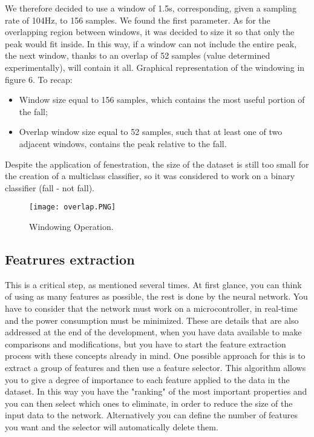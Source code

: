 \documentclass[12pt]{article}
\begin{document}
We therefore decided to use a window of 1.5s, corresponding, given a sampling rate of 104Hz, to 156 samples. We found the first parameter. 
As for the overlapping region between windows, it was decided to size it so that only the peak would fit inside. In this way, if a window can not include the entire peak, the next window, thanks to an overlap of 52 samples (value determined experimentally), will contain it all. Graphical representation of the windowing in figure 6.
To recap:
\begin{itemize}
  \item Window size equal to 156 samples, which contains the most useful portion of the fall;
  \item Overlap window size equal to 52 samples, such that at least one of two adjacent windows, contains the peak relative to the fall.
  \end{itemize}
Despite the application of fenestration, the size of the dataset is still too small for the creation of a multiclass classifier, so it was considered to work on a binary classifier (fall - not fall).
\begin{figure}[!h]
    \centering
    \texttt{[image: overlap.PNG]}
    \caption{Windowing Operation.}
    \label{fig:label}
\end{figure}

\subsection*{Featrures extraction}
This is a critical step, as mentioned several times. 
At first glance, you can think of using as many features as possible, the rest is done by the neural network. You have to consider that the network must work on a microcontroller, in real-time and the power consumption must be minimized. These are details that are also addressed at the end of the development, when you have data available to make comparisons and modifications, but you have to start the feature extraction process with these concepts already in mind.
One possible approach for this is to extract a group of features and then use a feature selector. This algorithm allows you to give a degree of importance to each feature applied to the data in the dataset. In this way you have the "ranking" of the most important properties and you can then select which ones to eliminate, in order to reduce the size of the input data to the network. Alternatively you can define the number of features you want and the selector will automatically delete them.
\end{document}
